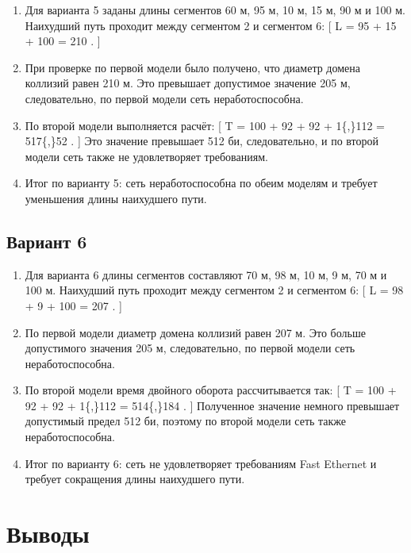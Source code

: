 \documentclass[
  english,
  russian,
  12pt,
  a4paper,
  DIV=11,
  numbers=noendperiod]{scrreprt}
\begin{document}
\begin{enumerate}
\def\labelenumi{\arabic{enumi}.}
\item
  Для варианта 5 заданы длины сегментов 60 м, 95 м, 10 м, 15 м, 90 м и
  100 м. Наихудший путь проходит между сегментом 2 и сегментом 6: {[} L
  = 95 + 15 + 100 = 210 . {]}
\item
  При проверке по первой модели было получено, что диаметр домена
  коллизий равен 210 м. Это превышает допустимое значение 205 м,
  следовательно, по первой модели сеть неработоспособна.
\item
  По второй модели выполняется расчёт: {[} T = 100 + 92 + 92 + 1\{,\}112
   = 517\{,\}52 . {]} Это значение превышает 512 би,
  следовательно, и по второй модели сеть также не удовлетворяет
  требованиям.
\item
  Итог по варианту 5: сеть неработоспособна по обеим моделям и требует
  уменьшения длины наихудшего пути.
\end{enumerate}

\section{Вариант 6}\label{ux432ux430ux440ux438ux430ux43dux442-6}

\begin{enumerate}
\def\labelenumi{\arabic{enumi}.}
\item
  Для варианта 6 длины сегментов составляют 70 м, 98 м, 10 м, 9 м, 70 м
  и 100 м. Наихудший путь проходит между сегментом 2 и сегментом 6: {[}
  L = 98 + 9 + 100 = 207 . {]}
\item
  По первой модели диаметр домена коллизий равен 207 м. Это больше
  допустимого значения 205 м, следовательно, по первой модели сеть
  неработоспособна.
\item
  По второй модели время двойного оборота рассчитывается так: {[} T =
  100 + 92 + 92 + 1\{,\}112  = 514\{,\}184 . {]}
  Полученное значение немного превышает допустимый предел 512 би,
  поэтому по второй модели сеть также неработоспособна.
\item
  Итог по варианту 6: сеть не удовлетворяет требованиям Fast Ethernet и
  требует сокращения длины наихудшего пути.
\end{enumerate}

\chapter{Выводы}\label{ux432ux44bux432ux43eux434ux44b}
\end{document}
